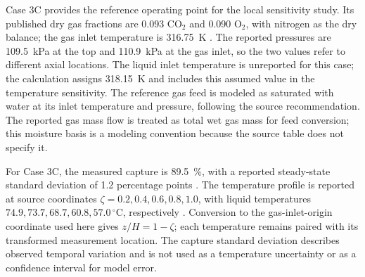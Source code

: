 Case 3C provides the reference operating point for the local sensitivity study.
Its published dry gas fractions are 0.093 CO$_2$ and 0.090 O$_2$, with nitrogen as the dry balance; the gas inlet temperature is \qty{316.75}{K} \cite[Table A1]{Morgan2020}.
The reported pressures are \qty{109.5}{kPa} at the top and \qty{110.9}{kPa} at the gas inlet, so the two values refer to different axial locations.
The liquid inlet temperature is unreported for this case; the calculation assigns \qty{318.15}{K} and includes this assumed value in the temperature sensitivity.
The reference gas feed is modeled as saturated with water at its inlet temperature and pressure, following the source recommendation.
The reported gas mass flow is treated as total wet gas mass for feed conversion; this moisture basis is a modeling convention because the source table does not specify it.

For Case 3C, the measured capture is \qty{89.5}{\percent}, with a reported steady-state standard deviation of 1.2 percentage points \cite[Table A1]{Morgan2020}.
The temperature profile is reported at source coordinates $\zeta=0.2,0.4,0.6,0.8,1.0$, with liquid temperatures $74.9,73.7,68.7,60.8,57.0\,^{\circ}\mathrm C$, respectively \cite[Table C2]{Morgan2020}.
Conversion to the gas-inlet-origin coordinate used here gives $z/H=1-\zeta$; each temperature remains paired with its transformed measurement location.
The capture standard deviation describes observed temporal variation and is not used as a temperature uncertainty or as a confidence interval for model error.



